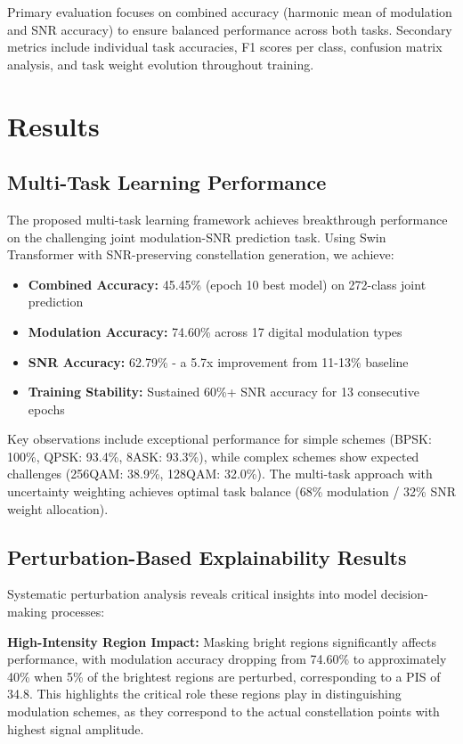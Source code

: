 \documentclass{ELSP}
\begin{document}
{{Primary evaluation focuses on combined accuracy (harmonic mean of modulation and SNR accuracy) to ensure balanced performance across both tasks. Secondary metrics include individual task accuracies, F1 scores per class, confusion matrix analysis, and task weight evolution throughout training.

\section{Results}

\subsection{Multi-Task Learning Performance}

The proposed multi-task learning framework achieves breakthrough performance on the challenging joint modulation-SNR prediction task. Using Swin Transformer with SNR-preserving constellation generation, we achieve:

\begin{itemize}
    \item \textbf{Combined Accuracy:} 45.45\% (epoch 10 best model) on 272-class joint prediction
    \item \textbf{Modulation Accuracy:} 74.60\% across 17 digital modulation types
    \item \textbf{SNR Accuracy:} 62.79\% - a 5.7x improvement from 11-13\% baseline
    \item \textbf{Training Stability:} Sustained 60\%+ SNR accuracy for 13 consecutive epochs
\end{itemize}

Key observations include exceptional performance for simple schemes (BPSK: 100\%, QPSK: 93.4\%, 8ASK: 93.3\%), while complex schemes show expected challenges (256QAM: 38.9\%, 128QAM: 32.0\%). The multi-task approach with uncertainty weighting achieves optimal task balance (68\% modulation / 32\% SNR weight allocation).

\subsection{Perturbation-Based Explainability Results}

Systematic perturbation analysis reveals critical insights into model decision-making processes:

\textbf{High-Intensity Region Impact:} Masking bright regions significantly affects performance, with modulation accuracy dropping from 74.60\% to approximately 40\% when 5\% of the brightest regions are perturbed, corresponding to a PIS of 34.8. This highlights the critical role these regions play in distinguishing modulation schemes, as they correspond to the actual constellation points with highest signal amplitude.

}}
\end{document}
